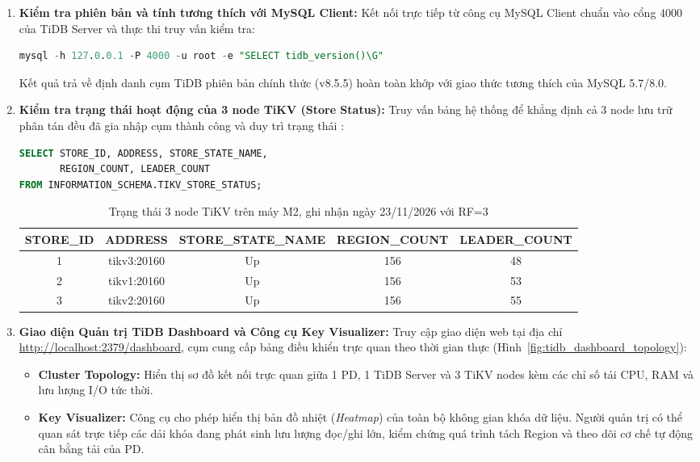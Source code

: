 \begin{enumerate}
  \item \textbf{Kiểm tra phiên bản và tính tương thích với MySQL Client:}
  Kết nối trực tiếp từ công cụ MySQL Client chuẩn vào cổng 4000 của TiDB Server và thực thi truy vấn kiểm tra:
\begin{lstlisting}[language=SQL, caption={Truy vấn thông tin phiên bản TiDB Server}]
mysql -h 127.0.0.1 -P 4000 -u root -e "SELECT tidb_version()\G"
\end{lstlisting}
  Kết quả trả về định danh cụm TiDB phiên bản chính thức (v8.5.5) hoàn toàn khớp với giao thức tương thích của MySQL 5.7/8.0.

  \item \textbf{Kiểm tra trạng thái hoạt động của 3 node TiKV (Store Status):}
  Truy vấn bảng hệ thống  để khẳng định cả 3 node lưu trữ phân tán đều đã gia nhập cụm thành công và duy trì trạng thái :
\begin{lstlisting}[language=SQL, caption={Kiểm tra trạng thái 3 node TiKV trong cụm}]
SELECT STORE_ID, ADDRESS, STORE_STATE_NAME,
       REGION_COUNT, LEADER_COUNT 
FROM INFORMATION_SCHEMA.TIKV_STORE_STATUS;
\end{lstlisting}

\begin{table}[H]
\centering
\caption{Trạng thái 3 node TiKV trên máy M2, ghi nhận ngày 23/11/2026 với RF=3}
\label{tab:tikv_status_verify}
\bangfont
\begin{tabular}{ccccc}
\toprule
\textbf{STORE\_ID} & \textbf{ADDRESS} & \textbf{STORE\_STATE\_NAME} & \textbf{REGION\_COUNT} & \textbf{LEADER\_COUNT}\\
\midrule
1 & tikv3:20160 & Up & 156 & 48\\
2 & tikv1:20160 & Up & 156 & 53\\
3 & tikv2:20160 & Up & 156 & 55\\
\bottomrule
\end{tabular}
\end{table}

  \item \textbf{Giao diện Quản trị TiDB Dashboard và Công cụ Key Visualizer:}
  Truy cập giao diện web tại địa chỉ \url{http://localhost:2379/dashboard}, cụm cung cấp bảng điều khiển trực quan theo thời gian thực (Hình~\ref{fig:tidb_dashboard_topology}):
  \begin{itemize}
    \item \textbf{Cluster Topology:} Hiển thị sơ đồ kết nối trực quan giữa 1 PD, 1 TiDB Server và 3 TiKV nodes kèm các chỉ số tải CPU, RAM và lưu lượng I/O tức thời.
    \item \textbf{Key Visualizer:} Công cụ cho phép hiển thị bản đồ nhiệt (\textit{Heatmap}) của toàn bộ không gian khóa dữ liệu. Người quản trị có thể quan sát trực tiếp các dải khóa đang phát sinh lưu lượng đọc/ghi lớn, kiểm chứng quá trình tách Region và theo dõi cơ chế tự động cân bằng tải của PD.
  \end{itemize}
\end{enumerate}

